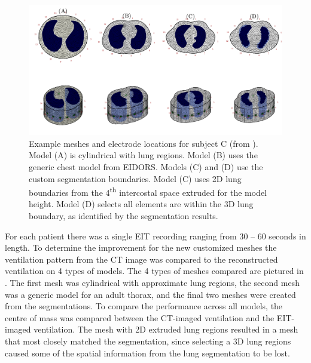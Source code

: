 \begin{figure}
	\centering
	\includegraphics[width=\textwidth]{chapter5-CT_to_mesh/imgs/fem_models_PT04.pdf}
	\caption[Custom and generic meshes]{\label{fig:fem-results}%
	Example meshes and electrode locations for subject C (from ).
	Model (A) is cylindrical with lung regions. Model (B) uses the generic chest model from EIDORS. 
	Models (C) and (D) use the custom segmentation boundaries. Model (C) uses 2D lung boundaries 
	from the 4\textsuperscript{th} intercostal space extruded for the model height. Model (D) selects all elements
	are within the 3D lung boundary, as identified by the segmentation results.
	}
\end{figure}

For each patient there was a single EIT recording ranging from 30 -- 60 seconds in length.
To determine the improvement for the new customized meshes the ventilation pattern 
from the CT image was compared to the reconstructed ventilation on 4 types of models.
The 4 types of meshes compared are pictured in . The first mesh was
cylindrical with approximate lung regions, the second mesh was a generic model 
for an adult thorax, and the final two meshes were created from the segmentations. 
To compare the performance across all models, the centre of mass  was 
compared between the CT-imaged ventilation and the EIT-imaged ventilation.
The mesh with 2D extruded lung regions resulted in a mesh that most closely matched 
the segmentation, since selecting a 3D lung regions caused some of the
spatial information from the lung segmentation to be lost.

